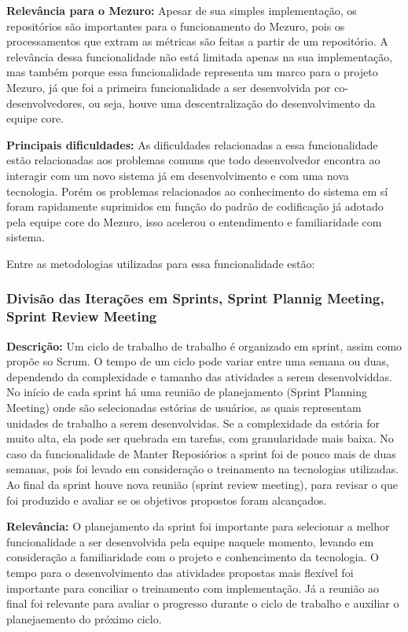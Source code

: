 \textbf{Relevância para o Mezuro:} Apesar de sua simples implementação, os repositórios são importantes para o funcionamento do Mezuro, pois os processamentos que extram as métricas são feitas a partir de um repositório. A relevância dessa funcionalidade não está limitada apenas na sua implementação, mas também porque essa funcionalidade representa um marco para o projeto Mezuro, já que foi a primeira funcionalidade a ser desenvolvida por co-desenvolvedores, ou seja, houve uma descentralização do desenvolvimento da equipe core.

\textbf{Principais dificuldades:} As dificuldades relacionadas a essa funcionalidade estão relacionadas aos problemas comuns que todo desenvolvedor encontra ao interagir com um novo sistema já em desenvolvimento e com uma nova tecnologia. Porém os problemas relacionados ao conhecimento do sistema em sí foram rapidamente suprimidos em função do padrão de codificação já adotado pela equipe core do Mezuro, isso acelerou o entendimento e familiaridade com sistema.

Entre as metodologias utilizadas para essa funcionalidade estão:

\subsubsection{Divisão das Iterações em Sprints, Sprint Plannig Meeting, Sprint Review Meeting}

\textbf{Descrição:} Um ciclo de trabalho de trabalho é organizado em sprint, assim como propõe so Scrum. O tempo de um ciclo pode variar entre uma semana ou duas, dependendo da complexidade e tamanho das atividades a serem desenvolviddas. No início de cada sprint há uma reunião de planejamento (Sprint Planning Meeting) onde são selecionadas estórias de usuários, as quais representam unidades de trabalho a serem desenvolvidas. Se a complexidade da estória for muito alta, ela pode ser quebrada em tarefas, com granularidade mais baixa. No caso da funcionalidade de Manter Reposiórios a sprint foi de pouco mais de duas semanas, pois foi levado em consideração o treinamento na tecnologias utilizadas. Ao final da sprint houve nova reunião (sprint review meeting), para revisar o que foi produzido e avaliar se os objetivos propostos foram alcançados.

\textbf{Relevância:} O planejamento da sprint foi importante para selecionar a melhor funcionalidade a ser desenvolvida pela equipe naquele momento, levando em consideração a familiaridade com o projeto e conhencimento da tecnologia. O tempo para o desenvolvimento das atividades propostas mais flexível foi importante para conciliar o treinamento com implementação. Já a reunião ao final foi relevante para avaliar o progresso durante o ciclo de trabalho e auxiliar o planejaemento do próximo ciclo.

